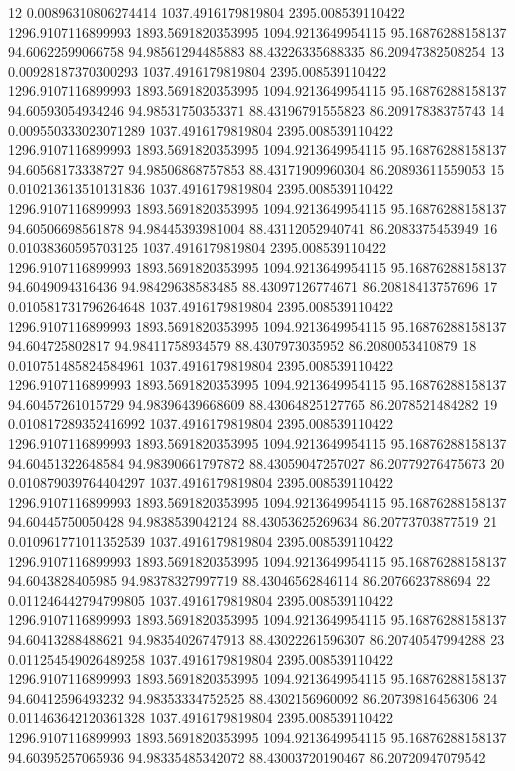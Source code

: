 {12 0.00896310806274414 1037.4916179819804 2395.008539110422 1296.9107116899993 1893.5691820353995 1094.9213649954115 95.16876288158137 94.60622599066758 94.98561294485883 88.43226335688335 86.20947382508254
13 0.00928187370300293 1037.4916179819804 2395.008539110422 1296.9107116899993 1893.5691820353995 1094.9213649954115 95.16876288158137 94.60593054934246 94.98531750353371 88.43196791555823 86.20917838375743
14 0.009550333023071289 1037.4916179819804 2395.008539110422 1296.9107116899993 1893.5691820353995 1094.9213649954115 95.16876288158137 94.60568173338727 94.98506868757853 88.43171909960304 86.20893611559053
15 0.010213613510131836 1037.4916179819804 2395.008539110422 1296.9107116899993 1893.5691820353995 1094.9213649954115 95.16876288158137 94.60506698561878 94.98445393981004 88.43112052940741 86.2083375453949
16 0.01038360595703125 1037.4916179819804 2395.008539110422 1296.9107116899993 1893.5691820353995 1094.9213649954115 95.16876288158137 94.6049094316436 94.98429638583485 88.43097126774671 86.20818413757696
17 0.010581731796264648 1037.4916179819804 2395.008539110422 1296.9107116899993 1893.5691820353995 1094.9213649954115 95.16876288158137 94.604725802817 94.98411758934579 88.4307973035952 86.2080053410879
18 0.010751485824584961 1037.4916179819804 2395.008539110422 1296.9107116899993 1893.5691820353995 1094.9213649954115 95.16876288158137 94.60457261015729 94.98396439668609 88.43064825127765 86.2078521484282
19 0.010817289352416992 1037.4916179819804 2395.008539110422 1296.9107116899993 1893.5691820353995 1094.9213649954115 95.16876288158137 94.60451322648584 94.98390661797872 88.43059047257027 86.20779276475673
20 0.010879039764404297 1037.4916179819804 2395.008539110422 1296.9107116899993 1893.5691820353995 1094.9213649954115 95.16876288158137 94.60445750050428 94.9838539042124 88.43053625269634 86.20773703877519
21 0.010961771011352539 1037.4916179819804 2395.008539110422 1296.9107116899993 1893.5691820353995 1094.9213649954115 95.16876288158137 94.6043828405985 94.98378327997719 88.43046562846114 86.2076623788694
22 0.011246442794799805 1037.4916179819804 2395.008539110422 1296.9107116899993 1893.5691820353995 1094.9213649954115 95.16876288158137 94.60413288488621 94.98354026747913 88.43022261596307 86.20740547994288
23 0.011254549026489258 1037.4916179819804 2395.008539110422 1296.9107116899993 1893.5691820353995 1094.9213649954115 95.16876288158137 94.60412596493232 94.98353334752525 88.4302156960092 86.20739816456306
24 0.011463642120361328 1037.4916179819804 2395.008539110422 1296.9107116899993 1893.5691820353995 1094.9213649954115 95.16876288158137 94.60395257065936 94.98335485342072 88.43003720190467 86.20720947079542
}
